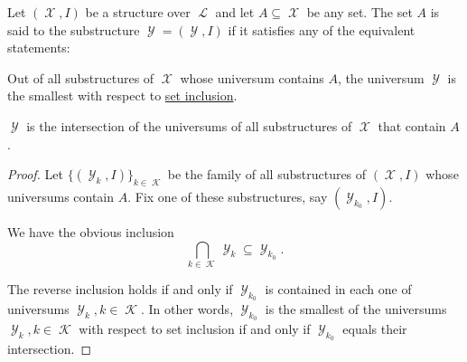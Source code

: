 \begin{definition}\label{def:first_order_generated_substructure}
  Let \( (\mscrX, I) \) be a structure over \( \mscrL \) and let \( A \subseteq \mscrX \) be any set. The set \( A \) is said to  the substructure \( \mscrY = (\mscrY, I) \) if it satisfies any of the equivalent statements:
  \begin{ThmEnum}
     Out of all substructures of \( \mscrX \) whose universum contains \( A \), the universum \( \mscrY \) is the smallest with respect to \hyperref[def:subset]{set inclusion}.

     \( \mscrY \) is the intersection of the universums of all substructures of \( \mscrX \) that contain \( A \).
  \end{ThmEnum}
\end{definition}
\begin{proof}
  Let \( \{ (\mscrY_k, I) \}_{k \in \mscrK} \) be the family of all substructures of \( (\mscrX, I) \) whose universums contain \( A \). Fix one of these substructures, say \( (\mscrY_{k_0}, I) \).

  We have the obvious inclusion
  \begin{equation*}
    \bigcap_{k \in \mscrK} \mscrY_k \subseteq \mscrY_{k_0}.
  \end{equation*}

  The reverse inclusion holds if and only if \( \mscrY_{k_0} \) is contained in each one of universums \( \mscrY_k, k \in \mscrK \). In other words, \( \mscrY_{k_0} \) is the smallest of the universums \( \mscrY_k, k \in \mscrK \) with respect to set inclusion if and only if \( \mscrY_{k_0} \) equals their intersection.
\end{proof}

